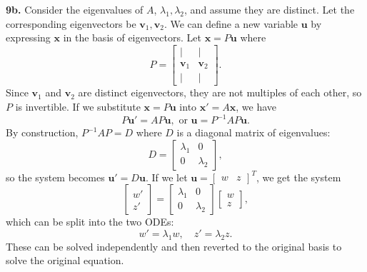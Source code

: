 \documentclass{article}
\newcommand{\bv}{\mathbf{v}}
\newcommand{\bu}{\mathbf{u}}
\newcommand{\bx}{\mathbf{x}}
\begin{document}
\textbf{9b.} Consider the eigenvalues of $A$, $\lambda_1, \lambda_2$, and assume they are distinct. Let the corresponding eigenvectors be $\bv_1, \bv_2$. We can define a new variable $\bu$ by expressing $\bx$ in the basis of eigenvectors. Let $\bx = P\bu$ where
$$P = \begin{bmatrix}
    | & | \\
    \bv_1 & \bv_2 \\
    | & |
\end{bmatrix}.$$
Since $\bv_1$ and $\bv_2$ are distinct eigenvectors, they are not multiples of each other, so $P$ is invertible. If we substitute $\bx = P\bu$ into $\bx' = A\bx$, we have
$$P\bu' = AP\bu, \text{ or } \bu = P^{-1}AP\bu.$$
By construction, $P^{-1}AP = D$ where $D$ is a diagonal matrix of eigenvalues:
$$D = \begin{bmatrix}
    \lambda_1 & 0 \\
    0 & \lambda_2
\end{bmatrix},$$
so the system becomes $\bu' = D\bu$. If we let $\bu = \begin{bmatrix}
    w & z
\end{bmatrix}^T$, we get the system
$$\begin{bmatrix}
    w' \\
    z'
\end{bmatrix}
= \begin{bmatrix}
    \lambda_1 & 0 \\
    0 & \lambda_2
\end{bmatrix}
\begin{bmatrix}
    w \\
    z
\end{bmatrix},$$
which can be split into the two ODEs:
$$w' = \lambda_1 w, \quad z' = \lambda_2 z.$$
These can be solved independently and then reverted to the original basis to solve the original equation.
\end{document}
